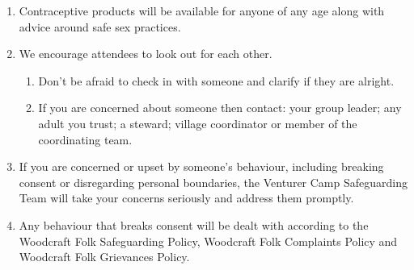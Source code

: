 \documentclass[a4paper, 11pt]{report}
\begin{document}
\begin{enumerate}
\begin{enumerate}
        \end{enumerate}
        \item Contraceptive products will be available for anyone of any age along with advice around safe sex practices. 
        \item We encourage attendees to look out for each other.
        \begin{enumerate}
            \item Don't be afraid to check in with someone and clarify if they are alright.
            \item If you are concerned about someone then contact:  your group leader; any adult you trust; a steward; village coordinator or member of the coordinating team.
        \end{enumerate}
        \item If you are concerned or upset by someone's behaviour, including breaking consent or disregarding personal boundaries, the Venturer Camp Safeguarding Team will take your concerns seriously and address them promptly.
        \item Any behaviour that breaks consent will be dealt with according to the Woodcraft Folk Safeguarding Policy, Woodcraft Folk Complaints Policy and Woodcraft Folk Grievances Policy.
    \end{enumerate}
\end{document}
